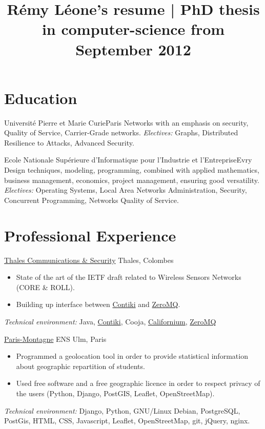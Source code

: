 \documentclass[letterpaper,final]{moderncv}
\title{Rémy Léone's resume | PhD thesis in computer-science from September 2012}
\begin{document}
\maketitle

\section{Education}

{Université Pierre et Marie Curie}{Paris}{}
{Networks with an emphasis on security, Quality of Service, Carrier-Grade networks.
  \newline
\textit{Electives:} Graphs, Distributed Resilience to Attacks, Advanced Security.}

{Ecole Nationale Supérieure d'Informatique pour l'Industrie et l'Entreprise}{Evry}{}
{Design techniques, modeling, programming, combined with applied mathematics, business management, economics,
  project management, ensuring good versatility.
  \newline
  \textit{Electives:} Operating Systems, Local Area Networks Administration, Security,
Concurrent Programming, Networks Quality of Service.}

\section{Professional Experience}

{
  \href{www.thalesgroup.com}{Thales Communications \& Security}
}
{Thales, Colombes}
{}{
  \begin{itemize}
    \item State of the art of the IETF draft related to Wireless Sensors Networks (CORE \& ROLL).
    \item Building up interface between \href{www.contiki-os.org}{Contiki} and \href{zeromq.org}{ZeroMQ}.
  \end{itemize}
  \textit{Technical environment:} Java, \href{www.contiki-os.org}{Contiki},
  Cooja, \href{https://people.inf.ethz.ch/mkovatsc/californium.php}{Californium},
  \href{zeromq.org}{ZeroMQ}
}

{\href{www.paris-montagne.org}{Paris-Montagne}}
{ENS Ulm, Paris}{}{
  \begin{itemize}
    \item Programmed a geolocation tool in order to provide statistical information
      about geographic repartition of students.
    \item Used free software and a free geographic licence in order
      to respect privacy of the users (Python, Django, PostGIS, Leaflet, OpenStreetMap).
  \end{itemize}
  \textit{Technical environment:} Django, Python, GNU/Linux Debian, PostgreSQL,
PostGis, HTML, CSS, Javascript, Leaflet, OpenStreetMap, git, jQuery, nginx.}
\end{document}
